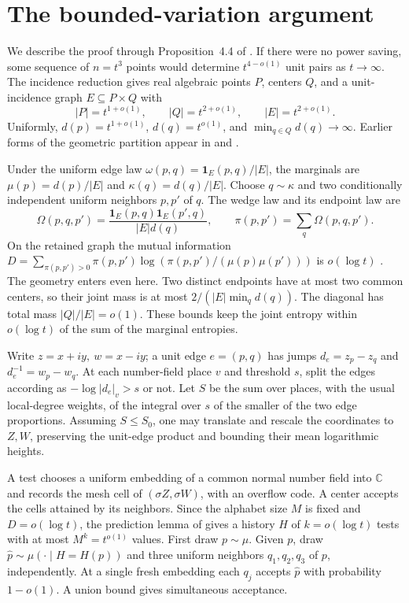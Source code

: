 \documentclass[11pt,letterpaper,oneside,reqno]{amsart}
\theoremstyle{definition}
\begin{document}
\section{The bounded-variation argument}

We describe the proof through Proposition~4.4 of \cite{OAI2}.
If there were no power saving, some sequence of \(n=t^3\) points would
determine \(t^{4-o(1)}\) unit pairs as \(t\to\infty\).
The incidence reduction gives real algebraic points \(P\), centers \(Q\),
and a unit-incidence graph \(E\subseteq P\times Q\) with
\[
 |P|=t^{1+o(1)},\qquad |Q|=t^{2+o(1)},\qquad |E|=t^{2+o(1)}.
\]
Uniformly, \(d(p)=t^{1+o(1)}\), \(d(q)=t^{o(1)}\), and
\(\min_{q\in Q}d(q)\to\infty\). Earlier forms of the geometric partition
appear in \cite[Corollary~5.11]{katz-silier} and
\cite[\S3]{pach-raz-solymosi}.

Under the uniform edge law \(\omega(p,q)=\mathbf1_E(p,q)/|E|\), the
marginals are \(\mu(p)=d(p)/|E|\) and \(\kappa(q)=d(q)/|E|\).
Choose \(q\sim\kappa\) and two conditionally independent uniform
neighbors \(p,p'\) of \(q\). The wedge law and its endpoint law are
\[
 \Omega(p,q,p')=\frac{\mathbf1_E(p,q)\mathbf1_E(p',q)}{|E|d(q)},
 \qquad \pi(p,p')=\sum_q\Omega(p,q,p').
\]
On the retained graph the mutual information
\(D=\sum_{\pi(p,p')>0}\pi(p,p')\log(\pi(p,p')/(\mu(p)\mu(p')))\)
is \(o(\log t)\) \cite[\S2]{OAI2}.
The geometry enters even here. Two distinct endpoints have at most two
common centers, so their joint mass is at most \(2/(|E|\min_q d(q))\).
The diagonal has total mass \(|Q|/|E|=o(1)\). These bounds keep the
joint entropy within \(o(\log t)\) of the sum of the marginal entropies.

Write \(z=x+iy,\ w=x-iy\); a unit edge \(e=(p,q)\) has jumps
\(d_e=z_p-z_q\) and \(d_e^{-1}=w_p-w_q\).
At each number-field place \(v\) and threshold \(s\), split the edges
according as \(-\log|d_e|_v>s\) or not. Let \(S\) be the sum over places,
with the usual local-degree weights, of the integral over \(s\) of the
smaller of the two edge proportions. Assuming \(S\le S_0\), one may
translate and rescale the coordinates to \(Z,W\), preserving the
unit-edge product and bounding their mean logarithmic heights.

A test chooses a uniform embedding of a common normal number field into
\(\mathbb C\) and records the mesh cell of \((\sigma Z,\sigma W)\), with an overflow
code. A center accepts the cells attained by its neighbors. Since the
alphabet size \(M\) is fixed and \(D=o(\log t)\), the prediction lemma
of \cite[\S3]{OAI2} gives a history \(H\) of \(k=o(\log t)\) tests
with at most \(M^k=t^{o(1)}\) values. First draw \(p\sim\mu\). Given
\(p\), draw \(\widehat p\sim\mu(\cdot\mid H=H(p))\) and three uniform
neighbors \(q_1,q_2,q_3\) of \(p\), independently. At a single fresh
embedding each \(q_j\) accepts \(\widehat p\) with probability \(1-o(1)\).
A union bound gives simultaneous acceptance.
\end{document}
